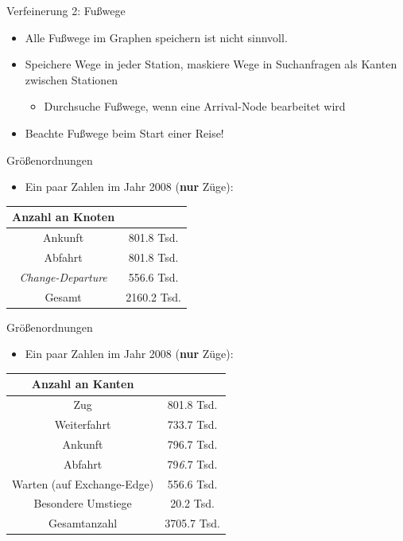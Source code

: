 \begin{frame}{Verfeinerung 2: Fußwege}
	\begin{itemize}
		\item Alle Fußwege im Graphen speichern ist nicht sinnvoll.
		\pause
		\item Speichere Wege in jeder Station, maskiere Wege in Suchanfragen als Kanten zwischen Stationen
		\begin{itemize}
			\item Durchsuche Fußwege, wenn eine Arrival-Node bearbeitet wird 
		\end{itemize}
		\item Beachte Fußwege beim Start einer Reise!
	\end{itemize}
\end{frame}


\begin{frame}{Größenordnungen}
	\begin{itemize}
		\item Ein paar Zahlen im Jahr 2008 (\textbf{nur} Züge):
	\end{itemize}
\vspace{3em}
	\begin{center}
		\begin{tabular}{ c|c } 
			Anzahl an Knoten & \\
 			\hline
 			Ankunft & 801.8 Tsd. \\
 			Abfahrt & 801.8 Tsd. \\
 			\textit{Change-Departure} & 556.6 Tsd. \\
 			\hline
 			Gesamt & 2160.2 Tsd.
		\end{tabular}
	\end{center}
\end{frame}


\begin{frame}{Größenordnungen}
	\begin{itemize}
		\item Ein paar Zahlen im Jahr 2008 (\textbf{nur} Züge):
	\end{itemize}
	\vspace{2em}
	\begin{center}
		\begin{tabular}{ c|c } 
			Anzahl an Kanten & \\
 			\hline
 			Zug & 801.8 Tsd. \\
 			Weiterfahrt & 733.7 Tsd. \\
 			Ankunft & 796.7 Tsd. \\
 			Abfahrt & 79\textit{6}.7 Tsd. \\
 			Warten (auf Exchange-Edge) & 556.6 Tsd. \\
 			Besondere Umstiege & 20.2 Tsd. \\
 			\hline
 			Gesamtanzahl & 3705.7 Tsd.
		\end{tabular}
	\end{center}
\end{frame}



